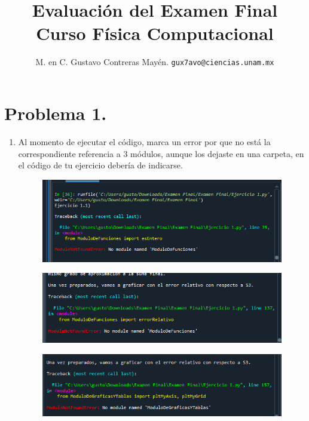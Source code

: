 
\usepackage{minted}

\author{M. en C. Gustavo Contreras Mayén. \texttt{gux7avo@ciencias.unam.mx}}
\title{Evaluación del Examen Final \\ {\large Curso Física Computacional}}
\date{ }


\maketitle
\fontsize{14}{14}\selectfont

\section{Problema 1.}

\begin{enumerate}
\item Al momento de ejecutar el código, marca un error por que no está la correspondiente referencia a $3$ módulos, aunque los dejaste en una carpeta, en el código de tu ejercicio debería de indicarse.
\begin{figure}[H]
    \centering
    \includegraphics[scale=0.8]{Evidencia_Antonio_01.png}
\end{figure}
\begin{figure}[H]
    \centering
    \includegraphics[scale=0.8]{Evidencia_Antonio_02.png}
\end{figure}
\begin{figure}[H]
    \centering
    \includegraphics[scale=0.8]{Evidencia_Antonio_03.png}

\end{figure}
\end{enumerate}
